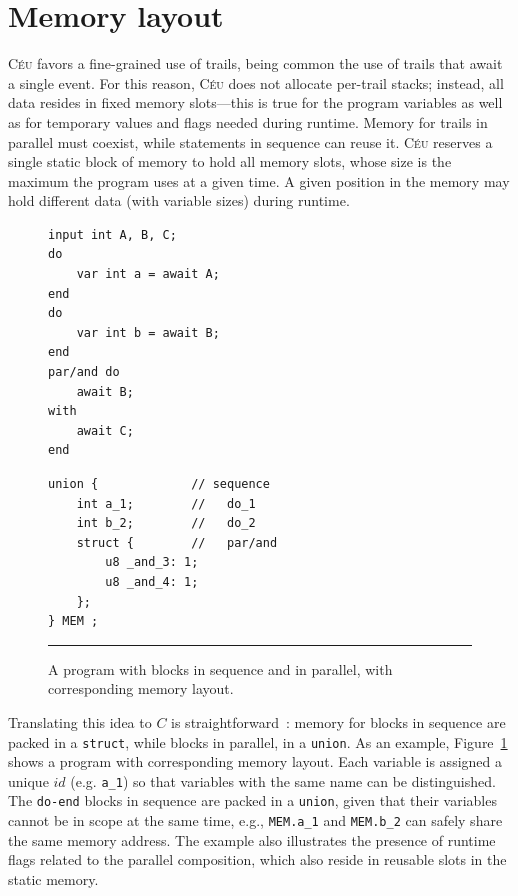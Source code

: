 \documentclass{sigplanconf}
\newcommand{\CEU}{\textsc{C\'{e}u}\xspace}
\newcommand{\code}[1] {{\small{\texttt{#1}}}}
\newcommand{\1}{\;}
\newcommand{\2}{\;\;}
\newcommand{\3}{\;\;\;}
\newcommand{\5}{\;\;\;\;\;}
\begin{document}
\section{Memory layout}
\label{sec:impl:memory}

\CEU{} favors a fine-grained use of trails, being common the use of trails that 
await a single event.
For this reason, \CEU{} does not allocate per-trail stacks; instead, all data 
resides in fixed memory slots---this is true for the program variables as well 
as for temporary values and flags needed during runtime.
%
Memory for trails in parallel must coexist, while statements in sequence can 
reuse it.
%
\CEU reserves a single static block of memory to hold all memory slots, whose 
size is the maximum the program uses at a given time.
A given position in the memory may hold different data (with variable sizes) 
during runtime.

\begin{figure}[t]
\begin{minipage}[t]{0.45\linewidth}
\begin{lstlisting}
input int A, B, C;
do
    var int a = await A;
end
do
    var int b = await B;
end
par/and do
    await B;
with
    await C;
end
\end{lstlisting}
\end{minipage}
%
\begin{minipage}[t]{0.55\linewidth}
\begin{lstlisting}
union {             // sequence
    int a_1;        //   do_1
    int b_2;        //   do_2
    struct {        //   par/and
        u8 _and_3: 1;
        u8 _and_4: 1;
    };
} MEM ;
\end{lstlisting}
\end{minipage}
\rule{14cm}{0.37pt}
\caption{
A program with blocks in sequence and in parallel, with corresponding memory 
layout.
{\small %
}%
\label{lst.impl.mem}
}
\end{figure}

Translating this idea to $C$ is straightforward~\cite{wsn.osm,wsn.ocram}: 
memory for blocks in sequence are packed in a \code{struct}, while blocks in 
parallel, in a \code{union}.
%
As an example, Figure~\ref{lst.impl.mem} shows a program with corresponding 
memory layout.
%
Each variable is assigned a unique $id$ (e.g. \code{a\_1}) so that variables 
with the same name can be distinguished.
%
The \code{do-end} blocks in sequence are packed in a \code{union}, given that 
their variables cannot be in scope at the same time, e.g., \code{MEM.a\_1} and 
\code{MEM.b\_2} can safely share the same memory address.
%
The example also illustrates the presence of runtime flags related to the 
parallel composition, which also reside in reusable slots in the static memory.
\end{document}
